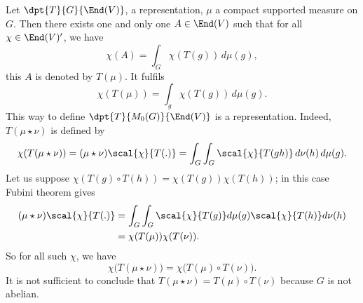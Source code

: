 Let $\dpt{T}{G}{\End(V)}$, a representation, $\mu$ a compact supported measure on $G$. Then there exists one and only one $A\in\End(V)$ such that for all $\chi\in\End(V)'$, we have
\begin{equation}
  \chi(A)=\int_G\chi(T(g))\,d\mu(g),
\end{equation}
this $A$ is denoted by $T(\mu)$. It fulfils
\begin{equation}
  \chi(T(\mu))=\int_g\chi(T(g))\,d\mu(g).
\end{equation}
This way to define $\dpt{T}{M_0(G)}{\End(V)}$ is a representation. Indeed, $T(\mu\star\nu)$ is defined by
\begin{equation}
\chi(T(\mu\star\nu))	=(\mu\star\nu)\scal{\chi}{T(.)}
			=\int_G\int_G\scal{\chi}{T(gh)}\,d\nu(h)\,d\mu(g).
\end{equation}
Let us suppose $\chi(T(g)\circ T(h))=\chi(T(g))\chi(T(h))$; in this case Fubini theorem gives
\begin{equation}
\begin{split}
  (\mu\star\nu)\scal{\chi}{T(.)}&=\int_G\int_G\scal{\chi}{T(g)}d\mu(g)\scal{\chi}{T(h)}d\nu(h)\\
			&=\chi(T(\mu))\chi(T(\nu)).
\end{split}
\end{equation}
So for all such $\chi$, we have
\[ 
  \chi\big(T(\mu\star\nu)\big)=\chi\big(T(\mu)\circ T(\nu)\big).
\]
It is not sufficient to conclude that $T(\mu\star\nu)=T(\mu)\circ T(\nu)$ because $G$ is not abelian.

%
%
